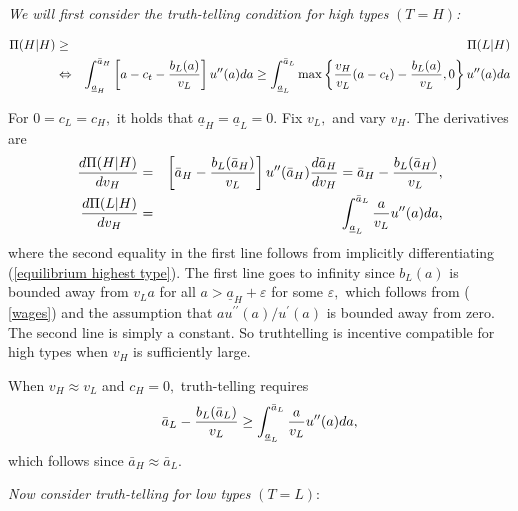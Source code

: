 \documentclass[12pt]{article}
\begin{document}
\textit{We will first consider the truth-telling condition for high types }$%
(T=H)$\textit{:}

\begin{eqnarray}
\Pi (H|H) &\geq &\Pi (L|H)  \label{truth1} \\
&\Leftrightarrow &\int_{\underline{a}_{H}}^{\bar{a}_{H}}\left[ a-c_{t}-\frac{%
b_{L}(a)}{v_{L}}\right] u^{\prime \prime }(a)da\geq \int_{\underline{a}%
_{L}}^{\bar{a}_{L}}\max \left\{ \frac{v_{H}}{v_{L}}(a-c_{t})-\frac{b_{L}(a)}{%
v_{L}},0\right\} u^{\prime \prime }(a)da  \label{truth2}
\end{eqnarray}

For $0=c_{L}=c_{H},$ it holds that $\underline{a}_{H}=\underline{a}_{L}=0.$
Fix $v_{L},$ and vary $v_{H}.$ The derivatives are%
\begin{eqnarray}
\frac{d\Pi (H|H)}{dv_{H}} &=&\left[ \bar{a}_{H}-\frac{b_{L}(\bar{a}_{H})}{%
v_{L}}\right] u^{\prime \prime }(\bar{a}_{H})\frac{d\bar{a}_{H}}{dv_{H}}=%
\bar{a}_{H}-\frac{b_{L}(\bar{a}_{H})}{v_{L}},  \label{truth3} \\
\frac{d\Pi (L|H)}{dv_{H}} &=&\int_{\underline{a}_{L}}^{\bar{a}_{L}}\frac{a}{%
v_{L}}u^{\prime \prime }(a)da,  \label{truth4}
\end{eqnarray}%
where the second equality in the first line follows from implicitly
differentiating (\ref{equilibrium highest type}). The first line goes to
infinity since $b_{L}(a)$ is bounded away from $v_{L}a$ for all $a>%
\underline{a}_{H}+\varepsilon $ for some $\varepsilon ,$ which follows from (%
\ref{wages}) and the assumption that $au^{\prime \prime }(a)/u^{\prime }(a)$
is bounded away from zero. The second line is simply a constant. So
truthtelling is incentive compatible for high types when $v_{H}$ is
sufficiently large.

When $v_{H}\approx v_{L}$ and $c_{H}=0,$ truth-telling requires 
\begin{equation}
\bar{a}_{L}-\frac{b_{L}(\bar{a}_{L})}{v_{L}}\geq \int_{\underline{a}_{L}}^{%
\bar{a}_{L}}\frac{a}{v_{L}}u^{\prime \prime }(a)da,  \label{truth-local}
\end{equation}%
which follows since $\bar{a}_{H}\approx \bar{a}_{L}.$

\textit{Now consider truth-telling for low types }$(T=L):$
\end{document}
